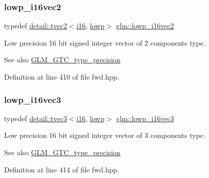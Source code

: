 \subsubsection{\texorpdfstring{lowp\+\_\+i16vec2}{lowp\_i16vec2}}
{\footnotesize\ttfamily typedef \hyperlink{structglm_1_1detail_1_1tvec2}{detail\+::tvec2}$<$\hyperlink{group__gtc__type__precision_ga35e5542ca05b29cc256fdafb8503d1fd}{i16}, \hyperlink{namespaceglm_a0f04f086094c747d227af4425893f545ae161af3fc695e696ce3bf69f7332bc2d}{lowp}$>$ \hyperlink{group__gtc__type__precision_ga47c5d4c919266799ecc76d832356feff}{glm\+::lowp\+\_\+i16vec2}}

Low precision 16 bit signed integer vector of 2 components type. \begin{DoxySeeAlso}{See also}
\hyperlink{group__gtc__type__precision}{G\+L\+M\+\_\+\+G\+T\+C\+\_\+type\+\_\+precision} 
\end{DoxySeeAlso}


Definition at line 410 of file fwd.\+hpp.

\mbox{\label{group__gtc__type__precision_ga5b71f24a26316aa21f3c58d25c8db9a8}} 
\subsubsection{\texorpdfstring{lowp\+\_\+i16vec3}{lowp\_i16vec3}}
{\footnotesize\ttfamily typedef \hyperlink{structglm_1_1detail_1_1tvec3}{detail\+::tvec3}$<$\hyperlink{group__gtc__type__precision_ga35e5542ca05b29cc256fdafb8503d1fd}{i16}, \hyperlink{namespaceglm_a0f04f086094c747d227af4425893f545ae161af3fc695e696ce3bf69f7332bc2d}{lowp}$>$ \hyperlink{group__gtc__type__precision_ga5b71f24a26316aa21f3c58d25c8db9a8}{glm\+::lowp\+\_\+i16vec3}}

Low precision 16 bit signed integer vector of 3 components type. \begin{DoxySeeAlso}{See also}
\hyperlink{group__gtc__type__precision}{G\+L\+M\+\_\+\+G\+T\+C\+\_\+type\+\_\+precision} 
\end{DoxySeeAlso}


Definition at line 414 of file fwd.\+hpp.

\mbox{\label{group__gtc__type__precision_ga59ea63973187e1e990fb6633d1800c6d}} 
